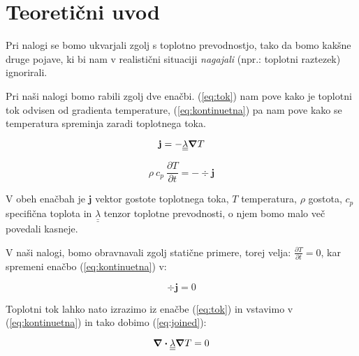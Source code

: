 \documentclass[12pt]{article}
\begin{document}
\newpage
\section{Teoretični uvod}

Pri nalogi se bomo ukvarjali zgolj s toplotno prevodnostjo, tako da bomo kakšne druge pojave, ki bi nam v realistični situaciji \textit{nagajali} (npr.: toplotni raztezek) ignorirali.

Pri naši nalogi bomo rabili zgolj dve enačbi. (\ref{eq:tok}) nam pove kako je toplotni tok odvisen od gradienta temperature, (\ref{eq:kontinuetna}) pa nam pove kako se temperatura spreminja zaradi toplotnega toka.

\begin{equation}
  \mathbf{j} = - \underline{\underline{\lambda}} \grad{T}
  \label{eq:tok}
\end{equation}

\begin{equation}
  \rho \ c_p\ \frac{\partial T}{\partial t} = - \div \mathbf{j}
  \label{eq:kontinuetna}
\end{equation}

V obeh enačbah je $\mathbf{j}$ vektor gostote toplotnega toka, $T$ temperatura, $\rho$ gostota, $c_p$ specifična toplota in $\underline{\underline{\lambda}}$ tenzor toplotne prevodnosti, o njem bomo malo več povedali kasneje.

V naši nalogi, bomo obravnavali zgolj statične primere, torej velja: $\frac{\partial T}{\partial t} = 0$, kar spremeni enačbo (\ref{eq:kontinuetna}) v:

$$
\div \mathbf{j} = 0
$$

\noindent Toplotni tok lahko nato izrazimo iz enačbe (\ref{eq:tok}) in vstavimo v (\ref{eq:kontinuetna}) in tako dobimo (\ref{eq:joined}):

\begin{equation}
  \div \underline{\underline{\lambda}} \grad{T} = 0
  \label{eq:joined}
\end{equation}
\end{document}
